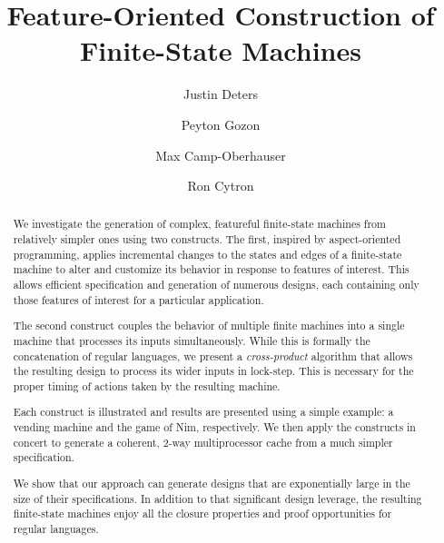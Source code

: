 \documentclass[sigplan,anonymous,review]{acmart}
\begin{document}
\title{Feature-Oriented Construction of Finite-State Machines}

\author{Justin Deters}

\author{Peyton Gozon}

\author{Max Camp-Oberhauser}

\author{Ron Cytron}


\renewcommand{\shortauthors}{Deters et al.}

\begin{abstract}
We investigate the generation of complex, featureful finite-state machines from relatively simpler ones using two constructs.  The first, inspired by aspect-oriented programming, applies incremental changes to the states and edges of a finite-state machine to alter and customize its behavior in response to features of interest.   This allows efficient specification and generation of numerous designs, each containing only those features of interest for a particular application.

The second construct couples the behavior of multiple finite machines into a single machine that processes its inputs simultaneously.  While this is formally the concatenation of regular languages, we present a \emph{cross-product} algorithm that allows the resulting design to process its wider inputs in lock-step.  This is necessary for the proper timing of actions taken by the resulting machine. 

Each construct is illustrated and results are presented using a simple example:  a vending machine and the game of Nim, respectively.  We then apply the constructs in concert to generate a coherent, 2-way multiprocessor cache from a much simpler specification.

We show that our approach can generate designs that are exponentially large in the size of their specifications.  In addition to that significant design leverage, the resulting finite-state machines enjoy all the closure properties and proof opportunities for regular languages.
\end{abstract}
\end{document}
